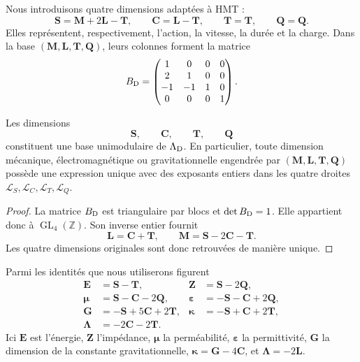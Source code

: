 Nous introduisons quatre dimensions adaptées à HMT :
\[
 \mathbf S=\mathbf M+2\mathbf L-\mathbf T,
 \qquad
 \mathbf C=\mathbf L-\mathbf T,
 \qquad
 \mathbf T=\mathbf T,
 \qquad
 \mathbf Q=\mathbf Q.
\]
Elles représentent, respectivement, l'action, la vitesse, la durée et la charge. Dans la
base \((\mathbf M,\mathbf L,\mathbf T,\mathbf Q)\), leurs colonnes forment la
matrice
\[
 B_{\rm D}=
 \begin{pmatrix}
 1&0&0&0\\
 2&1&0&0\\
 -1&-1&1&0\\
 0&0&0&1
 \end{pmatrix}.
\]

\begin{theorem}
\label{thm:base-dimensional-hmt}
Les dimensions
\[
 \mathbf S,\qquad\mathbf C,\qquad\mathbf T,\qquad\mathbf Q
\]
constituent une base unimodulaire de
\(\Lambda_{\rm D}\). En particulier, toute dimension mécanique,
électromagnétique ou gravitationnelle engendrée par
\((\mathbf M,\mathbf L,\mathbf T,\mathbf Q)\) possède une expression unique avec des
exposants entiers dans les quatre droites
\(\mathcal L_S,\mathcal L_C,\mathcal L_T,\mathcal L_Q\).
\end{theorem}

\begin{proof}
La matrice \(B_{\rm D}\) est triangulaire par blocs et
\(\det B_{\rm D}=1\). Elle appartient donc à
\(\operatorname{GL}_4(\mathbb Z)\). Son inverse entier fournit
\[
 \mathbf L=\mathbf C+\mathbf T,
 \qquad
 \mathbf M=\mathbf S-2\mathbf C-\mathbf T.
\]
Les quatre dimensions originales sont donc retrouvées de manière unique.
\end{proof}

Parmi les identités que nous utiliserons figurent
\begin{align}
 \mathbf E&=\mathbf S-\mathbf T,
 &\mathbf Z&=\mathbf S-2\mathbf Q,\label{eq:dim-EZ}\\
 \boldsymbol\mu&=\mathbf S-\mathbf C-2\mathbf Q,
 &\boldsymbol\varepsilon&=-\mathbf S-\mathbf C+2\mathbf Q,
 \label{eq:dim-mueps}\\
 \mathbf G&=-\mathbf S+5\mathbf C+2\mathbf T,
 &\boldsymbol\kappa&=-\mathbf S+\mathbf C+2\mathbf T,
 \label{eq:dim-Gkappa}\\
 \boldsymbol\Lambda&=-2\mathbf C-2\mathbf T.
 \label{eq:dim-Lambda}
\end{align}
Ici \(\mathbf E\) est l'énergie, \(\mathbf Z\) l'impédance,
\(\boldsymbol\mu\) la perméabilité, \(\boldsymbol\varepsilon\)
la permittivité, \(\mathbf G\) la dimension de la constante gravitationnelle,
\(\boldsymbol\kappa=\mathbf G-4\mathbf C\), et
\(\boldsymbol\Lambda=-2\mathbf L\).


